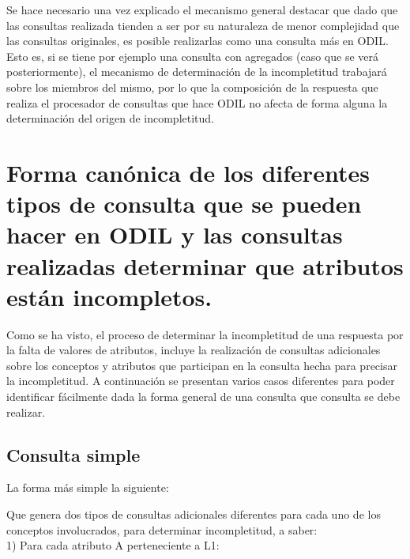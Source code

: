 Se hace necesario una vez explicado el mecanismo general destacar que dado que las consultas realizada tienden a ser por su naturaleza de menor complejidad que las consultas originales, es posible realizarlas como una consulta más en ODIL. Esto es, si se tiene por ejemplo una consulta con agregados (caso que se verá posteriormente), el mecanismo de determinación de la incompletitud trabajará sobre los miembros del mismo, por lo que la composición de la respuesta que realiza el procesador de consultas que hace ODIL no afecta de forma alguna la determinación del origen de incompletitud.\\

\section{Forma canónica de los diferentes tipos de consulta que se pueden hacer en ODIL y las consultas realizadas determinar que atributos están incompletos.}\label{section-formaCanonica}

Como se ha visto, el proceso de determinar la incompletitud de una respuesta por la falta de valores de atributos, incluye la realización de consultas adicionales sobre los conceptos y atributos que participan en la consulta hecha para precisar la incompletitud. A continuación se presentan varios casos diferentes para poder identificar fácilmente dada la forma general de una consulta que consulta se debe realizar. \\

\subsection{Consulta simple}

La forma más simple la siguiente: \\


Que genera dos tipos  de consultas adicionales diferentes para cada uno de los conceptos involucrados, para determinar incompletitud, a saber: \\

1) Para cada atributo A perteneciente a L1: 


